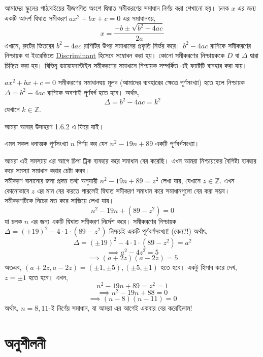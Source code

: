 \documentclass[11pt]{report}
\begin{document}
আমাদের স্কুলের পাঠ্যবইয়ের বীজগণিত অংশে দ্বিঘাত সমীকরণের সমাধান নির্ণয় করা শেখানো হয়। চলক $x$ এর জন্য একটি আদর্শ দ্বিঘাত সমীকরণ $ax^2+bx+c=0$ এর সমাধানদ্বয়, $$x= \frac{-b \pm \sqrt{b^2-4ac}}{2a}$$ এখানে, রুটের ভিতরের $b^2-4ac$ রাশিটির উপর সমাধানের প্রকৃতি নির্ভর করে। $b^2-4ac$ রাশিকে সমীকরণের নিশ্চায়ক বা ইংরেজিতে \href{https://en.wikipedia.org/wiki/Discriminant}{Discriminant} হিসেবে সম্বোধন করা হয়। কোনো সমীকরণের নিশ্চায়ককে $D$ বা $\Delta$ দ্বারা চিহ্নিত করা হয়। বিভিন্ন ডায়োফ্যান্টাইন সমীকরণের সমাধানে নিশ্চায়ক সম্পর্কিত এই ফ্যাক্টটি ব্যবহার করা যায়।\\

\begin{tcolorbox}[colframe=blue!80!blue]
$ax^2+bx+c=0$ সমীকরণের সমাধানদ্বয় মূলদ (আমাদের ব্যবহারের ক্ষেত্রে পূর্ণসংখ্যা) হতে হলে নিশ্চায়ক $\Delta = b^2-4ac$ রাশিকে অবশ্যই পূর্ণবর্গ হতে হবে। অর্থাৎ, $$\Delta = b^2-4ac=k^2$$ যেখানে $k \in \mathbb{Z}$.
\end{tcolorbox}

আমরা আবার উদাহরণ 1.6.2 এ ফিরে যাই।\\

\begin{tcolorbox}[colframe=black!80!green,title=উদাহরণ 1.6.2]
এমন সকল ধনাত্মক পূর্ণসংখ্যা $n$ নির্ণয় কর যেন $n^2-19n+89$ একটি পূর্ণবর্গসংখ্যা।
\end{tcolorbox}

আমরা এই সমস্যায় এর আগে চিপা ট্রিক ব্যবহার করে সমাধান বের করেছি। এখন আমরা নিশ্চায়কের বৈশিষ্ট্য ব্যবহার করে সমস্যা সমাধান করার চেষ্টা করব।\\

সমীকরণ বানানোর জন্য প্রদত্ত তথ্য অনুযায়ী $n^2-19n+89=z^2$ লেখা যায়, যেখানে $z \in \mathbb{Z}$. এখন কোনোভাবে $z$ এর মান বের করতে পারলেই দ্বিঘাত সমীকরণ সমাধান করে সমাধানগুলো বের করা সম্ভব।\\

সমীকরণটিকে নিচের মত করে সাজিয়ে লেখা যায়। $$n^2-19n+(89-z^2)=0$$ যা চলক $n$ এর জন্য একটি দ্বিঘাত সমীকরণ নির্দেশ করে। সমীকরণের নিশ্চায়ক $\Delta = (\pm 19)^2 - 4 \cdot 1 \cdot (89-z^2)$ নিশ্চয়ই একটি পূর্ণবর্গসংখ্যা! (কেন?!) অর্থাৎ, $$\Delta = (\pm 19)^2 - 4 \cdot 1 \cdot (89-z^2) = a^2$$ $$\implies a^2 - 4z^2=5$$ $$\implies (a+2z)(a-2z) = 5$$ অতএব, $(a+2z,a-2z) = (\pm 1,\pm 5),(\pm 5,\pm 1)$ হতে হবে। একটু হিসাব করে দেখ, $z = \pm 1$ হতে হবে। এখন, $$n^2-19n+89=z^2=1$$ $$\implies n^2-19n+88=0$$ $$\implies (n-8)(n-11)=0$$ অর্থাৎ, $n=8, 11$-ই নির্ণেয় সমাধান, যা আমরা এর আগেই একবার বের করেছিলাম!\\

\section{অনুশীলনী}
\end{document}

